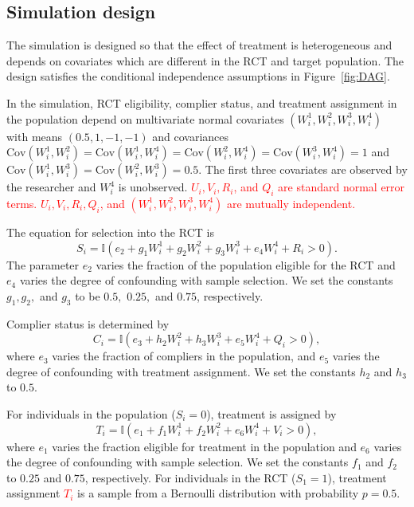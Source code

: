 \documentclass[hidelinks,12pt]{article}
\newcommand{\ind}{\mathbb{I}} %
\newcommand{\cov}{\mathrm{Cov}}
\begin{document}
\subsection{Simulation design}

The simulation is designed so that the effect of treatment is heterogeneous and depends on covariates which are different in the RCT and target population. The design satisfies the conditional independence assumptions in Figure~\ref{fig:DAG}.

In the simulation, RCT eligibility, complier status, and treatment assignment in the population depend on multivariate normal covariates $(W^{1}_i, W^{2}_i, W^{3}_i, W^{4}_i)$ with means $(0.5, 1, -1, -1)$ and covariances $\cov(W^{1}_i, W^{2}_i) = \cov(W^{1}_i, W^{4}_i)= \cov(W^{2}_i, W^{4}_i) = \cov(W^{3}_i, W^{4}_i) = 1$ and $\cov(W^{1}_i, W^{3}_i) = \cov(W^{2}_i, W^{3}_i) = 0.5$.  The first three covariates are observed by the researcher and $W^{4}_i$ is unobserved. \textcolor{red}{$U_i, V_i, R_i$, and $Q_i$ are standard normal error terms. $U_i, V_i, R_i, Q_i$, and $(W^{1}_i, W^{2}_i, W^{3}_i, W^{4}_i)$ are mutually independent.} 

The equation for selection into the RCT is
%	
\begin{equation*}
S_i = \ind(e_2 + g_1W^{1}_i + g_2W^{2}_i + g_3W^{3}_i + e_4W^{4}_i + R_i > 0).
\end{equation*}	
%
The parameter $e_2$ varies the fraction of the population eligible for the RCT and $e_4$ varies the degree of confounding with sample selection. We set the constants $g_1, g_2,$ and $g_3$ to be $0.5,$ $0.25,$ and $0.75$, respectively. 

Complier status is determined by
%	
\begin{equation*}
C_i = \ind(e_3 + h_2W^{2}_i + h_3W^{3}_i + e_5W^{4}_i + Q_i > 0),
\end{equation*}	
%
where $e_3$ varies the fraction of compliers in the population, and $e_5$ varies the degree of confounding with treatment assignment. We set the constants $h_2$ and $h_3$ to $0.5$. 

For individuals in the population ($S_i=0$), treatment is assigned by
%	
\begin{equation*}
T_i = \ind(e_1 + f_1W^{1}_i + f_2W^{2}_i + e_6W^{4}_i + V_i > 0),
\end{equation*}	
%
where $e_1$ varies the fraction eligible for treatment in the population and $e_6$ varies the degree of confounding with sample selection. We set the constants $f_1$ and $f_2$ to $0.25$ and $0.75$, respectively. For individuals in the RCT ($S_1=1$), treatment assignment \textcolor{red}{$T_i$} is a sample from a Bernoulli distribution with probability $p=0.5$.
\end{document}
